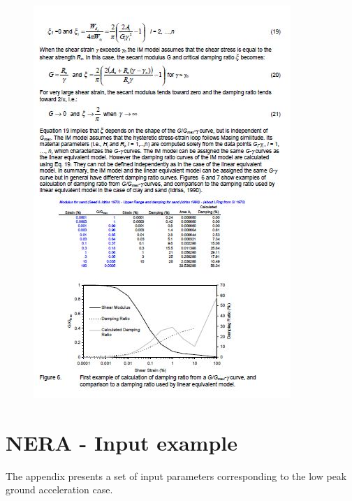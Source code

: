 \documentclass[11pt,a4paper]{report}
\begin{document}
\begin{figure}[h!]
	\centering
	\includegraphics[width=1\linewidth]{"NERA5"}
	\label{Nera5}
\end{figure}

\chapter{NERA - Input example} \label{Input_NERA}
The appendix presents a set of input parameters corresponding to the low peak ground acceleration case.
\end{document}
